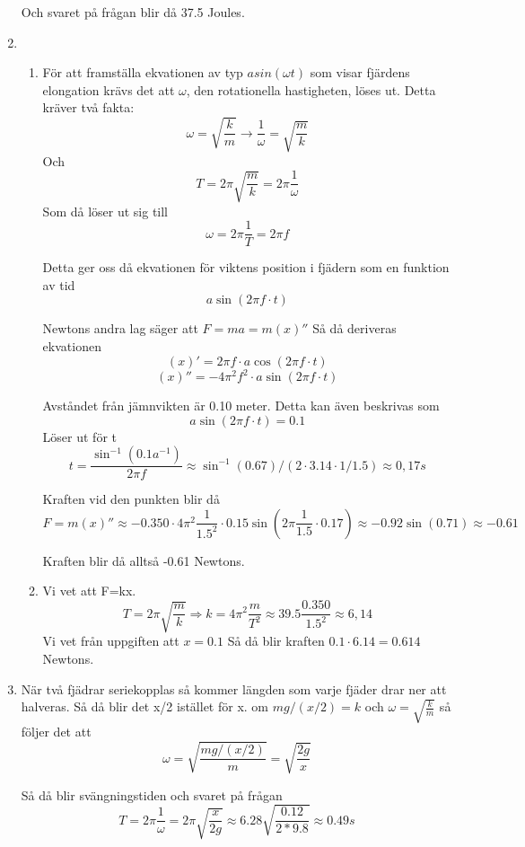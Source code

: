 \documentclass[a4paper,12pt]{article}
\begin{document}
\begin{enumerate}
    Och svaret på frågan blir då 37.5 Joules.

    \item 
    \begin{enumerate}
        \item För att framställa ekvationen av typ $asin(\omega t)$ som visar fjärdens 
        elongation krävs det att $\omega$, 
        den rotationella hastigheten, löses ut. Detta kräver två fakta:
        $$\omega=\sqrt{\frac{k}{m}}\rightarrow\frac{1}{\omega}=\sqrt{\frac{m}{k}}$$
        Och
        $$T=2\pi\sqrt{\frac{m}{k}}=2\pi\frac{1}{\omega}$$
        Som då löser ut sig till
        $$\omega=2\pi\frac{1}{T}=2\pi f$$
        
        Detta ger oss då ekvationen för viktens position i fjädern som
        en funktion av tid
        $$a\sin(2\pi f\cdot t)$$
 
        Newtons andra lag säger att $F=ma=m(x)''$
        Så då deriveras ekvationen
        $$(x)'=2\pi f\cdot a\cos(2\pi f\cdot t)$$
        $$(x)''=-4\pi^2 f^2\cdot a\sin(2\pi f\cdot t)$$

        Avståndet från jämnvikten är 0.10 meter. Detta kan även beskrivas som
        $$a\sin(2\pi f\cdot t)=0.1$$
        Löser ut för t
        $$t=\frac{\sin^{-1}(0.1a^{-1})}{2\pi f}\approx\sin^{-1}(0.67)/(2\cdot 3.14 \cdot 1/1.5)\approx 0,17s$$
    
    
        Kraften vid den punkten blir då
        $$
        F=m(x)''\approx-0.350\cdot4\pi^2 \frac{1}{1.5^2}\cdot 0.15\sin(2\pi \frac{1}{1.5}\cdot 0.17)
        \approx -0.92\sin(0.71) \approx -0.61
        $$

        Kraften blir då alltså -0.61 Newtons.

        \item Vi vet att F=kx. 
        $$T=2\pi\sqrt{\frac{m}{k}}\Rightarrow k=4\pi^2\frac{m}{T^2}\approx 39.5\frac{0.350}{1.5^2}\approx 6,14$$
        Vi vet från uppgiften att $x=0.1$
        Så då blir kraften $0.1\cdot 6.14 = 0.614$ Newtons.

    \end{enumerate}

    \item 
    När två fjädrar seriekopplas så kommer längden som varje fjäder drar ner att halveras.
    Så då blir det x/2 istället för x. 
    om $mg/(x/2)=k$ och $\omega = \sqrt{\frac{k}{m}}$ så följer det att 
    $$\omega = \sqrt{\frac{mg/(x/2)}{m}}=\sqrt{\frac{2g}{x}}$$

    Så då blir svängningstiden och svaret på frågan
    $$T=2\pi\frac{1}{\omega}=2\pi\sqrt{\frac{x}{2g}}\approx 6.28\sqrt{\frac{0.12}{2*9.8}}\approx 0.49s$$

\end{enumerate}
\end{document}
